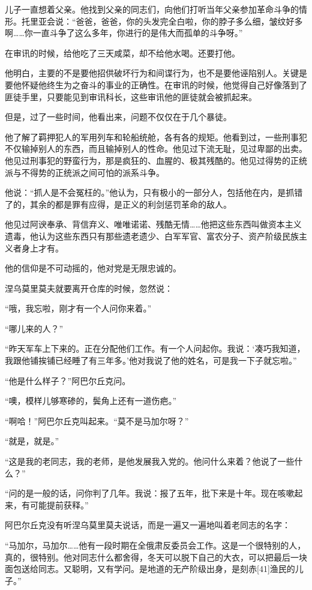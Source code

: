 儿子一直想着父亲。他找到父亲的同志们，向他们打听当年父亲参加革命斗争的情形。托里亚会说：“爸爸，爸爸，你的头发完全白啦，你的脖子多么细，皱纹好多啊……你一直斗争了这么多年，你进行的是伟大而孤单的斗争呀。”

在审讯的时候，给他吃了三天咸菜，却不给他水喝。还要打他。

他明白，主要的不是要他招供破坏行为和间谍行为，也不是要他诬陷别人。关键是要他怀疑他终生为之奋斗的事业的正确性。在审讯的时候，他觉得自己好像落到了匪徒手里，只要能见到审讯科长，这些审讯他的匪徒就会被抓起来。

但是，过了一些时间，他看出来，问题不仅仅在于几个暴徒。

他了解了羁押犯人的军用列车和轮船统舱，各有各的规矩。他看到过，一些刑事犯不仅输掉别人的东西，而且输掉别人的性命。他见过下流无耻，见过卑鄙的出卖。他见过刑事犯的野蛮行为，那是疯狂的、血腥的、极其残酷的。他见过得势的正统派与不得势的正统派之间可怕的派系斗争。

他说：“抓人是不会冤枉的。”他认为，只有极小的一部分人，包括他在内，是抓错了的，其余的都是罪有应得，是正义的利剑惩罚革命的敌人。

他见过阿谀奉承、背信弃义、唯唯诺诺、残酷无情……他把这些东西叫做资本主义遗毒，他认为这些东西只有那些遗老遗少、白军军官、富农分子、资产阶级民族主义者身上才有。

他的信仰是不可动摇的，他对党是无限忠诚的。

涅乌莫里莫夫就要离开仓库的时候，忽然说：

“哦，我忘啦，刚才有一个人问你来着。”

“哪儿来的人？”

“昨天军车上下来的。正在分配他们工作。有一个人问起你。我说：‘凑巧我知道，我跟他铺挨铺已经睡了有三年多。’他对我说了他的姓名，可是我一下子就忘啦。”

“他是什么样子？”阿巴尔丘克问。

“噢，模样儿够寒碜的，鬓角上还有一道伤疤。”

“啊哈！”阿巴尔丘克叫起来。“莫不是马加尔呀？”

“就是，就是。”

“这是我的老同志，我的老师，是他发展我入党的。他问什么来着？他说了一些什么？”

“问的是一般的话，问你判了几年。我说：报了五年，批下来是十年。现在咳嗽起来，有可能提前获释。”

阿巴尔丘克没有听涅乌莫里莫夫说话，而是一遍又一遍地叫着老同志的名字：

“马加尔，马加尔……他有一段时期在全俄肃反委员会工作。这是一个很特别的人，真的，很特别。他对同志什么都舍得，冬天可以脱下自己的大衣，可以把最后一块面包送给同志。又聪明，又有学问。是地道的无产阶级出身，是刻赤[41]渔民的儿子。”

